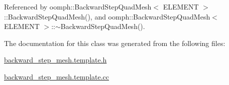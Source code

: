 Referenced by oomph\+::\+Backward\+Step\+Quad\+Mesh$<$ E\+L\+E\+M\+E\+N\+T $>$\+::\+Backward\+Step\+Quad\+Mesh(), and oomph\+::\+Backward\+Step\+Quad\+Mesh$<$ E\+L\+E\+M\+E\+N\+T $>$\+::$\sim$\+Backward\+Step\+Quad\+Mesh().



The documentation for this class was generated from the following files\+:\begin{DoxyCompactItemize}
\item 
\hyperlink{backward__step__mesh_8template_8h}{backward\+\_\+step\+\_\+mesh.\+template.\+h}\item 
\hyperlink{backward__step__mesh_8template_8cc}{backward\+\_\+step\+\_\+mesh.\+template.\+cc}\end{DoxyCompactItemize}
